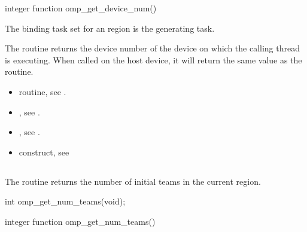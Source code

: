 \begin{fortranspecific}
\begin{ompfFunction}
integer function omp_get_device_num()
\end{ompfFunction}
\end{fortranspecific}

\binding
The binding task set for an  region is 
the generating task.

\effect
The  routine returns the device number of 
the device on which the calling thread is executing. When called on 
the host device, it will return the same value as the 
 routine.

\crossreferences
\begin{itemize}

\item {} routine, see
.

\item {}, see
.


\item {}, see
.

\item {} construct, see

\end{itemize}



\subsection{}
\label{subsec:omp_get_num_teams}
\summary
The  routine returns the number of initial 
teams in the current  region.

\format
\begin{ccppspecific}
\begin{ompcFunction}
int omp_get_num_teams(void);
\end{ompcFunction}
\end{ccppspecific}

\begin{fortranspecific}
\begin{ompfFunction}
integer function omp_get_num_teams()
\end{ompfFunction}
\end{fortranspecific}

